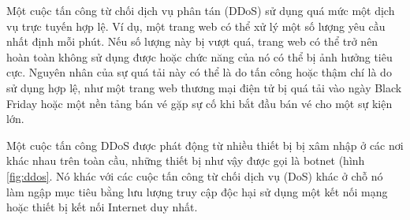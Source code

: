 \documentclass[a4paper]{article}
\begin{document}
Một cuộc tấn công từ chối dịch vụ phân tán (DDoS)  sử dụng quá mức một dịch vụ trực tuyến hợp lệ. Ví dụ, một trang web có thể xử lý một số lượng yêu cầu nhất định mỗi phút. Nếu số lượng này bị vượt quá, trang web có thể trở nên hoàn toàn không sử dụng được hoặc chức năng của nó có thể bị ảnh hưởng tiêu cực. Nguyên nhân của sự quá tải này có thể là do tấn công hoặc thậm chí là do sử dụng hợp lệ, như một trang web thương mại điện tử bị quá tải vào ngày Black Friday hoặc một nền tảng bán vé gặp sự cố khi bắt đầu bán vé cho một sự kiện lớn.

Một cuộc tấn công DDoS được phát động từ nhiều thiết bị bị xâm nhập ở các nơi khác nhau trên toàn cầu, những thiết bị như vậy được gọi là botnet (hình \ref{fig:ddos}.  Nó khác với các cuộc tấn công từ chối dịch vụ (DoS) khác ở chỗ nó làm ngập mục tiêu bằng lưu lượng truy cập độc hại sử dụng một kết nối mạng hoặc thiết bị kết nối Internet duy nhất.
\end{document}

